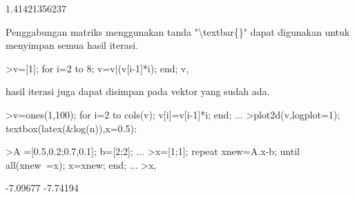 \documentclass[12pt,Times new roman,letterpaper]{book}
\begin{document}
\begin{eulernootebook}
\begin{eulercomment}
\begin{eulercomment}
\begin{eulernootebook}
\begin{eulercomment}
\begin{eulercomment}
\begin{eulercomment}
\begin{eulercomment}
\begin{eulercomment}
\begin{eulercomment}
\begin{eulernotebook}
\begin{eulercomment}
\begin{eulercomment}
\begin{eulercomment}
\begin{eulercomment}
\begin{eulercomment}
\begin{eulercomment}
\begin{eulercomment}
\begin{eulercomment}
\begin{eulercomment}
\begin{eulercomment}
\begin{eulercomment}
\begin{eulercomment}
\begin{eulercomment}
\begin{eulercomment}
\begin{eulercomment}
\begin{eulercomment}
\begin{eulercomment}
\begin{eulercomment}
\begin{eulercomment}
\begin{eulercomment}
\begin{eulercomment}
\begin{eulercomment}
\begin{eulercomment}
\begin{eulercomment}
\begin{eulercomment}
\begin{eulercomment}
\begin{eulercomment}
\begin{eulercomment}
\begin{eulercomment}
\begin{eulercomment}
\begin{eulercomment}
\begin{eulercomment}
\begin{euleroutput}
  1.41421356237
\end{euleroutput}
\begin{eulercomment}
Penggabungan matriks menggunakan tanda "\textbackslash{}textbar\{\}" dapat digunakan
untuk menyimpan semua hasil iterasi.
\end{eulercomment}
\begin{eulerprompt}
>v=[1]; for i=2 to 8; v=v|(v[i-1]*i); end; v,
\end{eulerprompt}
\begin{euleroutput}
  [1,  2,  6,  24,  120,  720,  5040,  40320]
\end{euleroutput}
\begin{eulercomment}
hasil iterasi juga dapat disimpan pada vektor yang sudah ada.
\end{eulercomment}
\begin{eulerprompt}
>v=ones(1,100); for i=2 to cols(v); v[i]=v[i-1]*i; end; ...
>plot2d(v,logplot=1); textbox(latex(&log(n)),x=0.5):
\end{eulerprompt}
\begin{eulerprompt}
>A =[0.5,0.2;0.7,0.1]; b=[2;2]; ...
>x=[1;1]; repeat xnew=A.x-b; until all(xnew~=x); x=xnew; end; ...
>x,
\end{eulerprompt}
\begin{euleroutput}
       -7.09677 
       -7.74194 
\end{euleroutput}
\begin{eulercomment}

\end{eulercomment}
\end{eulercomment}
\end{eulercomment}
\end{eulercomment}
\end{eulercomment}
\end{eulercomment}
\end{eulercomment}
\end{eulercomment}
\end{eulercomment}
\end{eulercomment}
\end{eulercomment}
\end{eulercomment}
\end{eulercomment}
\end{eulercomment}
\end{eulercomment}
\end{eulercomment}
\end{eulercomment}
\end{eulercomment}
\end{eulercomment}
\end{eulercomment}
\end{eulercomment}
\end{eulercomment}
\end{eulercomment}
\end{eulercomment}
\end{eulercomment}
\end{eulercomment}
\end{eulercomment}
\end{eulercomment}
\end{eulercomment}
\end{eulercomment}
\end{eulercomment}
\end{eulercomment}
\end{eulercomment}
\end{eulernotebook}
\end{eulercomment}
\end{eulercomment}
\end{eulercomment}
\end{eulercomment}
\end{eulercomment}
\end{eulercomment}
\end{eulernootebook}
\end{eulercomment}
\end{eulercomment}
\end{eulernootebook}
\end{document}
